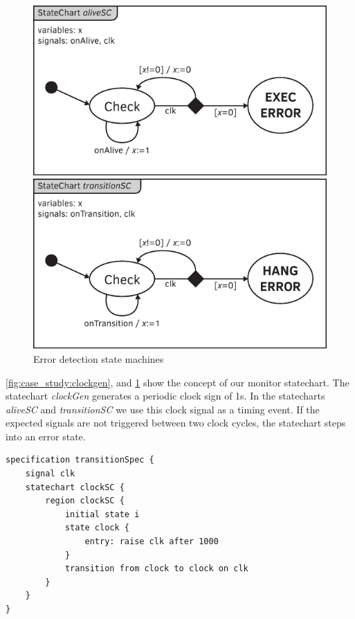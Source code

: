 \begin{figure}[h]
	\centering
	\begin{minipage}{0.49\linewidth}
		\includegraphics[width=0.9\linewidth]{include/figures/chapter_6/statecharts/onalive}
	\end{minipage}
	\begin{minipage}{0.49\linewidth}
		\includegraphics[width=0.9\linewidth]{include/figures/chapter_6/statecharts/ontransition}
	\end{minipage}
	\caption{Error detection state machines}
	\label{fig:case_study:errors}
\end{figure}

\cref{fig:case_study:clockgen}, and \cref{fig:case_study:errors} show the concept of our monitor statechart. The statechart \emph{clockGen} generates a periodic clock sign of 1\si{\second}. In the statecharts \emph{aliveSC} and \emph{transitionSC} we use this clock signal as a timing event. If the expected signals are not triggered between two clock cycles, the statechart steps into an error state.

\begin{lstlisting}[caption={Statechart representation of clock generation},label=lst:case_study:clk_gen]
specification transitionSpec {
    signal clk
    statechart clockSC {
        region clockSC {
            initial state i
            state clock {
                entry: raise clk after 1000
            }
            transition from clock to clock on clk
        }
    }
}
\end{lstlisting}

